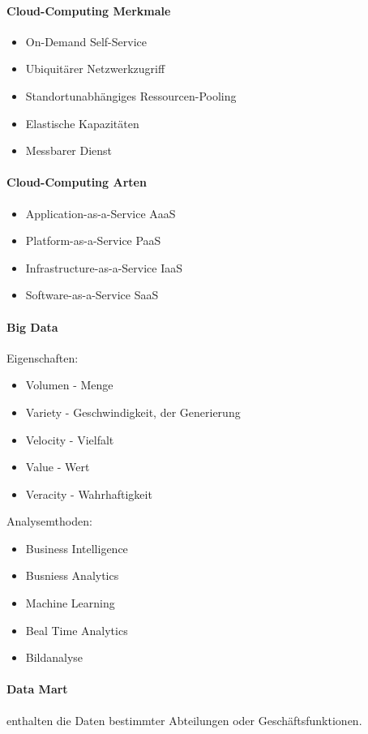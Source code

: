 \documentclass[twocolumn]{article}
\begin{document}
\paragraph{Cloud-Computing Merkmale}
	\begin{itemize}
		\item On-Demand Self-Service
		\item Ubiquitärer Netzwerkzugriff
		\item Standortunabhängiges Ressourcen-Pooling
		\item Elastische Kapazitäten
		\item Messbarer Dienst
	\end{itemize}

\paragraph{Cloud-Computing Arten}
	\begin{itemize}
		\item Application-as-a-Service AaaS
		\item Platform-as-a-Service PaaS
		\item Infrastructure-as-a-Service IaaS
		\item Software-as-a-Service SaaS
	\end{itemize}

\paragraph{Big Data}
Eigenschaften:
\begin{itemize}
	\item Volumen - Menge
	\item Variety - Geschwindigkeit, der Generierung
	\item Velocity - Vielfalt
	\item Value - Wert
	\item Veracity - Wahrhaftigkeit
\end{itemize}
Analysemthoden:
\begin{itemize}
	\item Business Intelligence
	\item Busniess Analytics
	\item Machine Learning
	\item Beal Time Analytics 
	\item Bildanalyse
\end{itemize}

\paragraph{Data Mart} enthalten die Daten bestimmter Abteilungen oder Geschäftsfunktionen.
\end{document}
